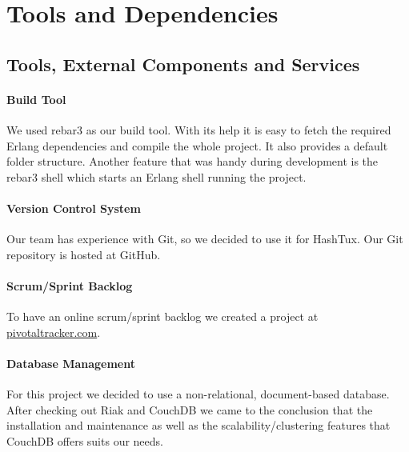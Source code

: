 \label{toolsanddeps}
\chapter{Tools and Dependencies}

\section{Tools, External Components and Services}

\subsubsection{Build Tool}
We used rebar3 as our build tool. With its help it is easy to fetch the required
Erlang dependencies and compile the whole project. It also provides a default
folder structure. Another feature that was handy during development is the
rebar3 shell which starts an Erlang shell running the project.

\subsubsection{Version Control System}
Our team has experience with Git, so we decided to use it for HashTux. Our Git
repository is hosted at GitHub.

\subsubsection{Scrum/Sprint Backlog}
To have an online scrum/sprint backlog we created a project at \newline
\href{http://www.pivotaltracker.com}{pivotaltracker.com}.

\subsubsection{Database Management}
For this project we decided to use a non-relational, document-based database.
After checking out Riak and CouchDB we came to the conclusion that the
installation and maintenance as well as the scalability/clustering features that
CouchDB offers suits our needs.


